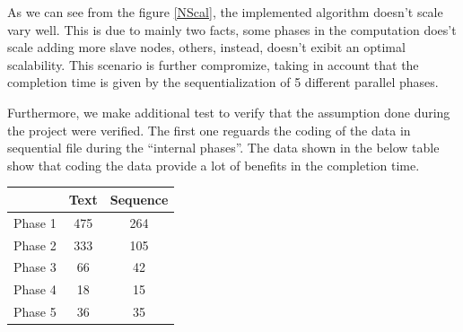 As we can see from the figure \ref{NScal}, the implemented algorithm doesn't scale vary well. This is due to mainly two facts, some phases in the computation does't scale adding more slave nodes, others, instead, doesn't exibit an optimal scalability. This scenario is further compromize, taking in account that the completion time is given by the sequentialization of 5 different parallel phases. %



Furthermore, we make additional test to verify that the assumption done during the project were verified. The first one reguards the coding of the data in sequential file during the ``internal phases''. The data shown in the below table show that coding the data provide a lot of benefits in the completion time.

\begin{center}
\begin{tabular}{ | l || c | c | }
  \hline      
  & Text & Sequence \\
  \hline      
  Phase 1 & 475 & 264 \\
  Phase 2 & 333 & 105 \\
  Phase 3 & 66 & 42 \\ 
  Phase 4 & 18 & 15 \\
  Phase 5 & 36 & 35 \\
  \hline  
\end{tabular}
\end{center}












